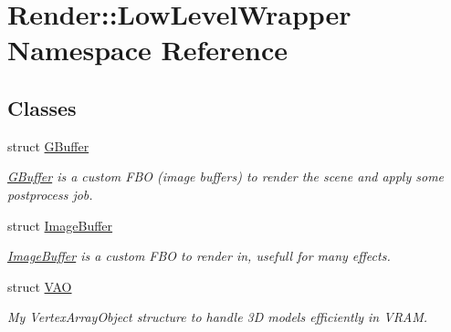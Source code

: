 \hypertarget{namespace_render_1_1_low_level_wrapper}{}\section{Render\+:\+:Low\+Level\+Wrapper Namespace Reference}
\label{namespace_render_1_1_low_level_wrapper}
\subsection*{Classes}
\begin{DoxyCompactItemize}
\item 
struct \hyperlink{struct_render_1_1_low_level_wrapper_1_1_g_buffer}{G\+Buffer}
\begin{DoxyCompactList}\small\item\em \hyperlink{struct_render_1_1_low_level_wrapper_1_1_g_buffer}{G\+Buffer} is a custom F\+BO (image buffers) to render the scene and apply some postprocess job. \end{DoxyCompactList}\item 
struct \hyperlink{struct_render_1_1_low_level_wrapper_1_1_image_buffer}{Image\+Buffer}
\begin{DoxyCompactList}\small\item\em \hyperlink{struct_render_1_1_low_level_wrapper_1_1_image_buffer}{Image\+Buffer} is a custom F\+BO to render in, usefull for many effects. \end{DoxyCompactList}\item 
struct \hyperlink{struct_render_1_1_low_level_wrapper_1_1_v_a_o}{V\+AO}
\begin{DoxyCompactList}\small\item\em My Vertex\+Array\+Object structure to handle 3D models efficiently in V\+R\+AM. \end{DoxyCompactList}\end{DoxyCompactItemize}
